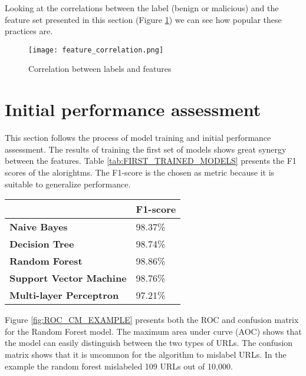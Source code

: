 Looking at the correlations between the label (benign or malicious) and the feature set presented in this section (Figure \ref{fig:FEATURE_CORRELATION}) we can see how popular these practices are.

\begin{figure}[t]
	\centering
	\texttt{[image: feature\_correlation.png]}
	\caption{Correlation between labels and features}
	\label{fig:FEATURE_CORRELATION}
\end{figure}

\section{Initial performance assessment}
This section follows the process of model training and initial performance assessment. The results of training the first set of models shows great synergy between the features. Table \ref{tab:FIRST_TRAINED_MODELS} presents the F1 scores of the alorightms. The F1-score is the chosen as metric because it is suitable to generalize performance.

\begin{singlespace}
	\begin{center}
		\label{tab:FIRST_TRAINED_MODELS}
		\begin{tabular}{ | m{13em} | m{13em} | }
			\hline
			                                & \textbf{F1-score} \\
			\hline
			\textbf{Naive Bayes}            & 98.37\%           \\
			\hline
			\textbf{Decision Tree}          & 98.74\%           \\
			\hline
			\textbf{Random Forest}          & 98.86\%           \\
			\hline
			\textbf{Support Vector Machine} & 98.76\%           \\
			\hline
			\textbf{Multi-layer Perceptron} & 97.21\%           \\
			\hline
		\end{tabular}
		\captionsetup{type=table}\caption{F-measure results of models training}
	\end{center}
\end{singlespace}

Figure \ref{fig:ROC_CM_EXAMPLE} presents both the ROC and confusion matrix for the Random Forest model. The maximum area under curve (AOC) shows that the model can easily distinguish between the two types of URLs. The confusion matrix shows that it is uncommon for the algorithm to mislabel URLs. In the example the random forest mislabeled 109 URLs out of 10,000.

